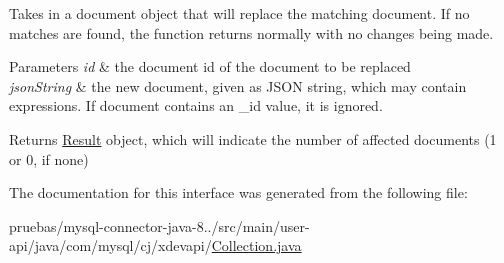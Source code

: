 Takes in a document object that will replace the matching document. If no matches are found, the function returns normally with no changes being made.


\begin{DoxyParams}{Parameters}
{\em id} & the document id of the document to be replaced \\
\hline
{\em json\+String} & the new document, given as J\+S\+ON string, which may contain expressions. If document contains an \+\_\+id value, it is ignored. \\
\hline
\end{DoxyParams}
\begin{DoxyReturn}{Returns}
\mbox{\hyperlink{interfacecom_1_1mysql_1_1cj_1_1xdevapi_1_1_result}{Result}} object, which will indicate the number of affected documents (1 or 0, if none) 
\end{DoxyReturn}


The documentation for this interface was generated from the following file\+:\begin{DoxyCompactItemize}
\item 
pruebas/mysql-\/connector-\/java-\/8../src/main/user-\/api/java/com/mysql/cj/xdevapi/\mbox{\hyperlink{_collection_8java}{Collection.\+java}}\end{DoxyCompactItemize}
